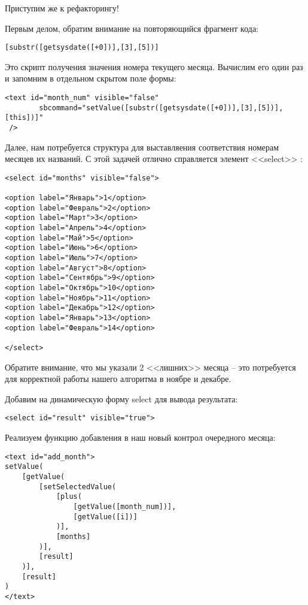 \documentclass[../index.tex]{subfiles}
\begin{document}
Приступим же к рефакторингу!

Первым делом, обратим внимание на повторяющийся фрагмент кода:

\begin{verbatim}
[substr([getsysdate([+0])],[3],[5])]
\end{verbatim}

Это скрипт получения значения номера текущего месяца.
Вычислим его один раз и запомним в отдельном скрытом поле формы:

\begin{verbatim}
<text id="month_num" visible="false"
        sbcommand="setValue([substr([getsysdate([+0])],[3],[5])],[this])]" 
 />
\end{verbatim}

Далее, нам потребуется структура для выставляения соответствия номерам месяцев их названий. С этой задачей отлично справляется элемент <<select>> :

\begin{verbatim}
<select id="months" visible="false"> 

<option label="Январь">1</option>
<option label="Февраль">2</option>
<option label="Март">3</option>
<option label="Апрель">4</option>
<option label="Май">5</option>
<option label="Июнь">6</option>
<option label="Июль">7</option>
<option label="Август">8</option>
<option label="Сентябрь">9</option>
<option label="Октябрь">10</option>
<option label="Ноябрь">11</option>
<option label="Декабрь">12</option>
<option label="Январь">13</option>
<option label="Февраль">14</option>

</select>
\end{verbatim}

Обратите внимание, что мы указали 2 <<лишних>> месяца -- это потребуется для корректной работы нашего алгоритма в ноябре и декабре.

Добавим на динамическую форму select для вывода результата:
\begin{verbatim}
<select id="result" visible="true"> 
\end{verbatim}

Реализуем функцию добавления в наш новый контрол очередного месяца:

\begin{verbatim}
<text id="add_month">
setValue(
    [getValue(
        [setSelectedValue(
            [plus(
                [getValue([month_num])],
                [getValue([i])]
            )], 
            [months]
        )],
        [result]
    )],
    [result]
)
</text>
\end{verbatim}
\end{document}

